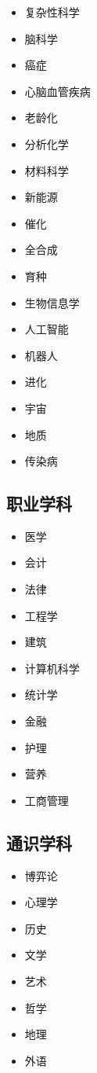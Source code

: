 \documentclass[]{tufte-book}
\providecommand{\tightlist}{%
  \setlength{\itemsep}{0pt}\setlength{\parskip}{0pt}}
\begin{document}
\begin{itemize}
\tightlist
\item
  复杂性科学
\item
  脑科学
\item
  癌症
\item
  心脑血管疾病
\item
  老龄化
\item
  分析化学
\item
  材料科学
\item
  新能源
\item
  催化
\item
  全合成
\item
  育种
\item
  生物信息学
\item
  人工智能
\item
  机器人
\item
  进化
\item
  宇宙
\item
  地质
\item
  传染病
\end{itemize}

\hypertarget{ux804cux4e1aux5b66ux79d1}{%
\subsection{职业学科}\label{ux804cux4e1aux5b66ux79d1}}

\begin{itemize}
\tightlist
\item
  医学
\item
  会计
\item
  法律
\item
  工程学
\item
  建筑
\item
  计算机科学
\item
  统计学
\item
  金融
\item
  护理
\item
  营养
\item
  工商管理
\end{itemize}

\hypertarget{ux901aux8bc6ux5b66ux79d1}{%
\subsection{通识学科}\label{ux901aux8bc6ux5b66ux79d1}}

\begin{itemize}
\tightlist
\item
  博弈论
\item
  心理学
\item
  历史
\item
  文学
\item
  艺术
\item
  哲学
\item
  地理
\item
  外语
\end{itemize}
\end{document}
